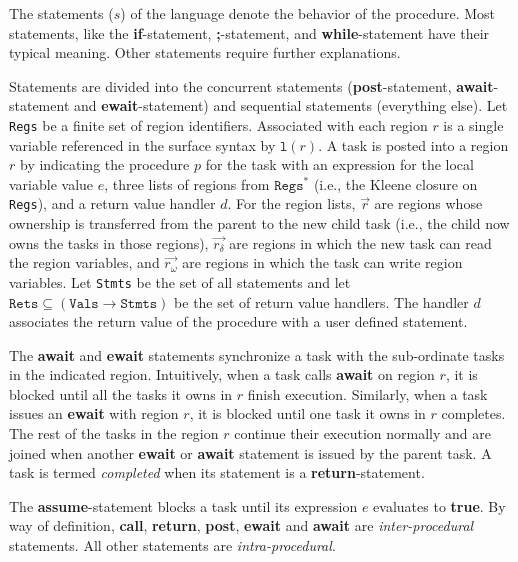 The statements ($s$) of the language denote the behavior of the procedure. Most statements, like the \textbf{if}-statement, \textbf{;}-statement, and \textbf{while}-statement have their typical meaning. Other statements require further explanations.

Statements are divided into the concurrent statements (\textbf{post}-statement, \textbf{await}-statement and \textbf{ewait}-statement) and sequential statements (everything else).  Let \texttt{Regs} be a finite set of region identifiers. Associated with each region $r$ is a single variable referenced in the surface syntax by $\texttt{l}(r)$. A task is posted into a region $r$ by indicating the procedure $p$ for the task with an expression for the local variable value $e$, three lists of regions from $\texttt{Regs}^\ast$ (i.e., the Kleene closure on \texttt{Regs}), and a return value handler $d$. For the region lists, $\vec{r}$ are regions whose ownership is transferred from the parent to the new child task (i.e., the child now owns the tasks in those regions), $\vec{r_\delta}$ are regions in which the new task can read the region variables, and $\vec{r_\omega}$ are regions in which the task can write region variables. Let \texttt{Stmts} be the set of all statements and let $\texttt{Rets} \subseteq (\texttt{Vals} \rightarrow \texttt{Stmts})$ be the set of return value handlers. The handler $d$ associates the return value of the procedure with a user defined statement. 

The \textbf{await} and \textbf{ewait} statements synchronize a task with the sub-ordinate tasks in the indicated region. Intuitively, when a task calls \textbf{await} on region $r$, it is blocked until all the tasks it owns in $r$ finish execution. Similarly, when a task issues an \textbf{ewait} with region $r$, it is blocked until one task it owns in $r$ completes. The rest of the tasks in the region  $r$ continue their execution normally and are joined when another \textbf{ewait} or \textbf{await} statement is issued by the parent task. A task is termed \emph{completed} when its statement is a \textbf{return}-statement. 

The \textbf{assume}-statement blocks a task until its expression $e$ evaluates to \textbf{true}. By way of definition, \textbf{call}, \textbf{return}, \textbf{post}, \textbf{ewait} and \textbf{await} are \emph{inter-procedural} statements. All other statements are \emph{intra-procedural}.

